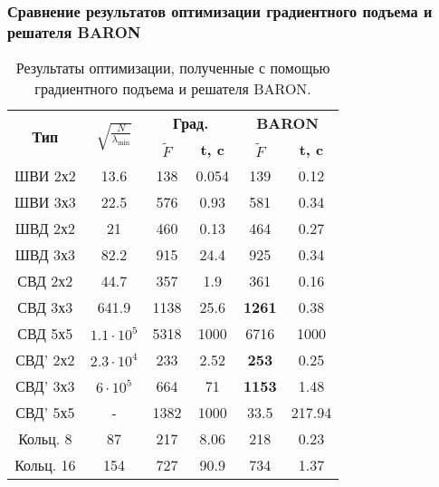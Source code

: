 \begin{frame}
    \frametitle{Сравнение результатов оптимизации градиентного подъема и решателя BARON}

\begin{table}[!h]
\centering
\caption{ Результаты оптимизации, полученные с помощью градиентного подъема и решателя BARON.}
\begin{tabular}{|c|c|c c|c c|}
    \hline
    \multirow{2}{*}{\textbf{Тип}} & \multirow{2}{*}{$\sqrt{\frac{N}{\lambda_{\min}}}$} & \multicolumn{2}{c}{\textbf{Град.}} & \multicolumn{2}{|c|}{\textbf{BARON}} \\
    & & \textbf{$\tilde{F}$} & \textbf{t, c} & \textbf{$\tilde{F}$} & \textbf{t, c} \\
    \hline
    ШВИ 2х2 & 13.6 & 138 & {0.054} & {139} & 0.12  \\
    ШВИ 3х3 & 22.5 & 576 & 0.93 & {581} & {0.34}  \\
    ШВД 2х2 & 21 & 460 & {0.13} & {464} & 0.27  \\
    ШВД 3х3 & 82.2 & 915 & 24.4 & {925} & {0.34}   \\
    СВД 2х2 & 44.7& 357 & 1.9 & {361} & {0.16}  \\
    СВД 3х3 & 641.9& 1138 & 25.6 & \textbf{1261} & {0.38} \\
    СВД 5х5 & $1.1\cdot10^{5}$ & 5318 & 1000 & 6716 & 1000 \\
    СВД' 2х2 & $2.3\cdot10^{4}$ & 233 & 2.52 & \textbf{253} & {0.25}  \\
    СВД' 3х3 & $6\cdot10^5$& 664 & 71 & \textbf{1153} & {1.48}  \\
    СВД' 5х5 & - & 1382 & 1000 & 33.5 & 217.94  \\
    Кольц. 8 & 87 & 217 & 8.06 & 218 & {0.23}  \\
    Кольц. 16          & 154 & 727 & 90.9 & 734 & {1.37}  \\
    \hline
\end{tabular}
\label{tab:results_0}
\end{table}
\end{frame}

